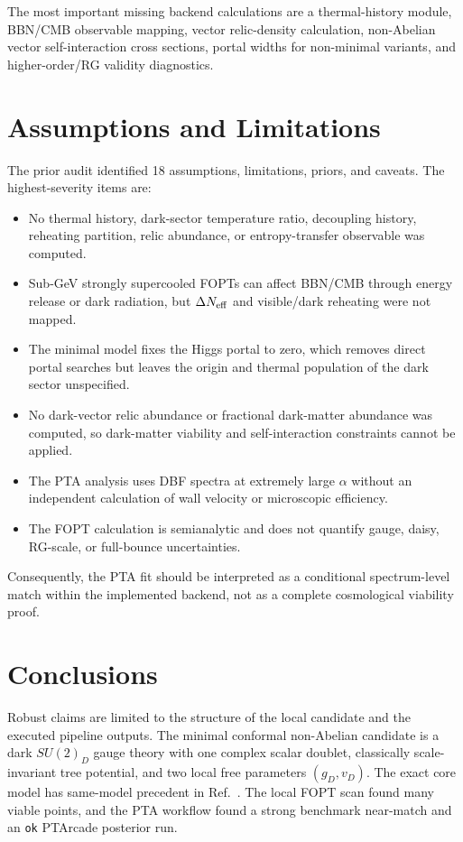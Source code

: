 \documentclass[11pt]{article}
\newcommand{\SUtwoD}{\ensuremath{SU(2)_D}}
\begin{document}
The most important missing backend calculations are a thermal-history module, BBN/CMB observable mapping, vector relic-density calculation, non-Abelian vector self-interaction cross sections, portal widths for non-minimal variants, and higher-order/RG validity diagnostics.

\section{Assumptions and Limitations}
The prior audit identified 18 assumptions, limitations, priors, and caveats. The highest-severity items are:
\begin{itemize}
\item No thermal history, dark-sector temperature ratio, decoupling history, reheating partition, relic abundance, or entropy-transfer observable was computed.
\item Sub-GeV strongly supercooled FOPTs can affect BBN/CMB through energy release or dark radiation, but $\Delta N_{\rm eff}$ and visible/dark reheating were not mapped.
\item The minimal model fixes the Higgs portal to zero, which removes direct portal searches but leaves the origin and thermal population of the dark sector unspecified.
\item No dark-vector relic abundance or fractional dark-matter abundance was computed, so dark-matter viability and self-interaction constraints cannot be applied.
\item The PTA analysis uses DBF spectra at extremely large $\alpha$ without an independent calculation of wall velocity or microscopic efficiency.
\item The FOPT calculation is semianalytic and does not quantify gauge, daisy, RG-scale, or full-bounce uncertainties.
\end{itemize}
Consequently, the PTA fit should be interpreted as a conditional spectrum-level match within the implemented backend, not as a complete cosmological viability proof.

\section{Conclusions}
Robust claims are limited to the structure of the local candidate and the executed pipeline outputs. The minimal conformal non-Abelian candidate is a dark \SUtwoD{} gauge theory with one complex scalar doublet, classically scale-invariant tree potential, and two local free parameters $(g_D,v_D)$. The exact core model has same-model precedent in Ref.~\cite{Borah2021}. The local FOPT scan found many viable points, and the PTA workflow found a strong benchmark near-match and an \texttt{ok} PTArcade posterior run.
\end{document}
